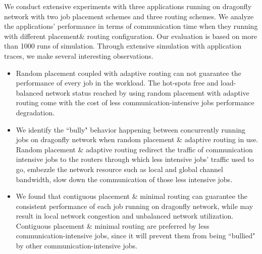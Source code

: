 \documentclass[conference,compsoc]{IEEEtran}
\begin{document}
We conduct extensive experiments with three applications running on dragonfly network with two job placement schemes and three routing schemes. We analyze the applications' performance in terms of communication time when they running with different placement\& routing configuration. Our evaluation is based on more than 1000 runs of simulation. Through extensive simulation with application traces, we make several interesting observations. 



\begin{itemize}
   
    \item Random placement coupled with adaptive routing can not guarantee the performance of every job in the workload. The hot-spots free and load-balanced network status reached by using random placement with adaptive routing come with the cost of less communication-intensive jobs performance degradation. 

    \item We identify the ``bully" behavior happening between concurrently running jobs on dragonfly network when random placement \& adaptive routing in use. Random placement \& adaptive routing redirect the traffic of communication intensive jobs to the routers through which less intensive jobs' traffic used to go, embezzle the network resource such as local and global channel bandwidth, slow down the communication of those less intensive jobs.

    
    \item We found that contiguous placement \& minimal routing can guarantee the consistent performance of each job running on dragonfly network, while may result in local network congestion and unbalanced network utilization. Contiguous placement \& minimal routing are preferred by less communication-intensive jobs, since it will prevent them from being ``bullied" by other communication-intensive jobs.
    
         
\end{itemize}
\end{document}
